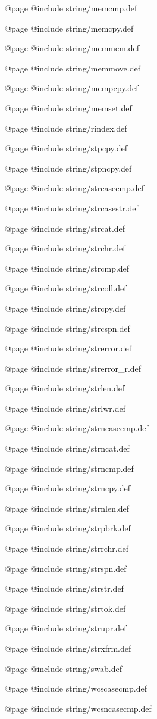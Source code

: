 @page
@include string/memcmp.def

@page
@include string/memcpy.def

@page
@include string/memmem.def

@page
@include string/memmove.def

@page
@include string/mempcpy.def

@page
@include string/memset.def

@page
@include string/rindex.def

@page
@include string/stpcpy.def

@page
@include string/stpncpy.def

@page
@include string/strcasecmp.def

@page
@include string/strcasestr.def

@page
@include string/strcat.def

@page
@include string/strchr.def

@page
@include string/strcmp.def

@page
@include string/strcoll.def

@page
@include string/strcpy.def

@page
@include string/strcspn.def

@page
@include string/strerror.def

@page
@include string/strerror_r.def

@page
@include string/strlen.def

@page
@include string/strlwr.def

@page
@include string/strncasecmp.def

@page
@include string/strncat.def

@page
@include string/strncmp.def

@page
@include string/strncpy.def

@page
@include string/strnlen.def

@page
@include string/strpbrk.def

@page
@include string/strrchr.def

@page
@include string/strspn.def

@page
@include string/strstr.def

@page
@include string/strtok.def

@page
@include string/strupr.def

@page
@include string/strxfrm.def

@page
@include string/swab.def

@page
@include string/wcscasecmp.def

@page
@include string/wcsncasecmp.def
